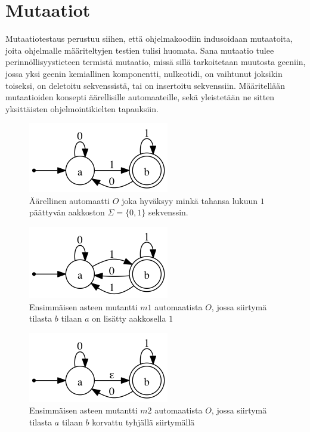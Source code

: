 \documentclass{tktltiki}
\begin{document}
\section{Mutaatiot}
Mutaatiotestaus perustuu siihen, että ohjelmakoodiin indusoidaan mutaatoita, joita ohjelmalle määriteltyjen testien tulisi huomata. Sana mutaatio tulee perinnöllisyystieteen termistä mutaatio, missä sillä tarkoitetaan muutosta geeniin, jossa yksi geenin kemiallinen komponentti, nulkeotidi, on vaihtunut joksikin toiseksi, on deletoitu sekvenssistä, tai on insertoitu sekvenssiin. Määritellään mutaatioiden konsepti äärellisille automaateille, sekä yleistetään ne sitten yksittäisten ohjelmointikielten tapauksiin.

\begin{figure}[here]
\centering
\caption{Äärellinen automaatti $O$ joka hyväksyy minkä tahansa lukuun $1$ päättyvän aakkoston $\Sigma = \{0,1\}$ sekvenssin.}
\label{fig:nfa}
\includegraphics[scale=0.6]{automaatit/nfa.png}
\end{figure}

\begin{figure}[here]
\centering
\caption{Ensimmäisen asteen mutantti $m1$ automaatista $O$, jossa siirtymä tilasta $b$ tilaan $a$ on lisätty aakkosella $1$}
\label{fig:m1}
\includegraphics[scale=0.6]{automaatit/m1.png}
\end{figure}

\begin{figure}[here]
\centering
\caption{Ensimmäisen asteen mutantti $m2$ automaatista $O$, jossa siirtymä tilasta $a$ tilaan $b$ korvattu tyhjällä siirtymällä}
\label{fig:m2}
\includegraphics[scale=0.6]{automaatit/m2.png}
\end{figure}
\end{document}
